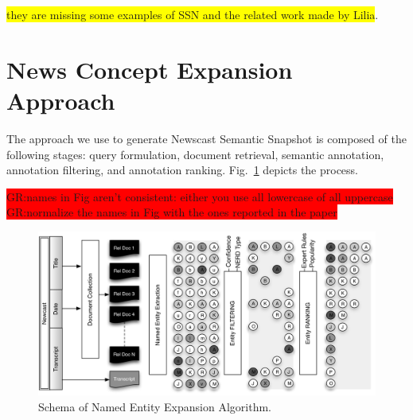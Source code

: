 \documentclass{llncs}
\newcommand{\hg}[1]{\colorbox{yellow}{#1}}
\newcommand{\todo}[1]{\colorbox{red}{#1}}
\begin{document}
\hg{they are missing some examples of SSN and the related work made by Lilia}.


\section{News Concept Expansion Approach}
\label{sec:ConceptExpansion}
The approach we use to generate Newscast Semantic Snapshot is composed of the following stages: query formulation, document retrieval, semantic annotation, annotation filtering, and annotation ranking. Fig.~\ref{fig:namedEntityExpansion} depicts the process.

\todo{GR:names in Fig aren't consistent: either you use all lowercase of all uppercase}
\todo{GR:normalize the names in Fig with the ones reported in the paper}
\begin{figure}[h!]
\centering
\includegraphics[width=1\textwidth]{figure/ExpansionDiagram}
\caption{Schema of Named Entity Expansion Algorithm.}
\label{fig:namedEntityExpansion}%
\end{figure}
\end{document}
